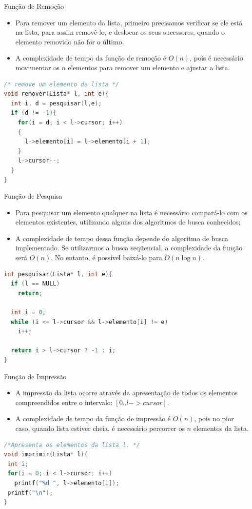 \begin{frame}[fragile,c]{Função de Remoção} 
	\begin{itemize}
		\item Para remover um elemento da lista, primeiro precisamos verificar se ele está na lista, para assim removê-lo, e deslocar os seus sucessores, quando o elemento removido não for o último.
		\item A complexidade de tempo da função de remoção é $O(n)$, pois é necessário movimentar os $n$ elementos para remover um elemento e ajustar a lista.
	\end{itemize}
	
\footnotesize
\begin{lstlisting}[language=C]
/* remove um elemento da lista */
void remover(Lista* l, int e){     
  int i, d = pesquisar(l,e);
  if (d != -1){
    for(i = d; i < l->cursor; i++)
    {
      l->elemento[i] = l->elemento[i + 1];
    }
    l->cursor--;
  }  
}
\end{lstlisting}	
\end{frame} 

\begin{frame}[fragile]{Função de Pesquisa} 
	\begin{itemize}
		\item Para pesquisar um elemento qualquer na lista é necessário compará-lo com os elementos existentes, utilizando alguns dos algoritmos de busca conhecidos;
		\item A complexidade de tempo dessa função depende do algoritmo de busca implementado. Se utilizarmos a busca seqüencial, a complexidade da função será $O(n)$. No entanto, é possível baixá-lo para $O(n\log n)$.
	\end{itemize}

\footnotesize
\begin{lstlisting}[language=C]
int pesquisar(Lista* l, int e){
  if (l == NULL)
    return;
  
  int i = 0;
  while (i <= l->cursor && l->elemento[i] != e)
    i++;
        
  return i > l->cursor ? -1 : i;
}
\end{lstlisting}
\end{frame}

\begin{frame}[fragile]{Função de Impressão}
\begin{itemize}
		\item A impressão da lista ocorre através da apresentação de todos os elementos compreendidos entre o intervalo: $[0.. l->cursor]$.
		\item A complexidade de tempo da função de impressão é $O(n)$, pois no pior caso, quando lista estiver cheia, é necessário percorrer os $n$ elementos da lista.
	\end{itemize}
	
\begin{lstlisting}[language=C]
/*Apresenta os elementos da lista l. */
void imprimir(Lista* l){
 int i;
 for(i = 0; i < l->cursor; i++)
   printf("%d ", l->elemento[i]);
 printf("\n");  
}
\end{lstlisting}	
\end{frame}

